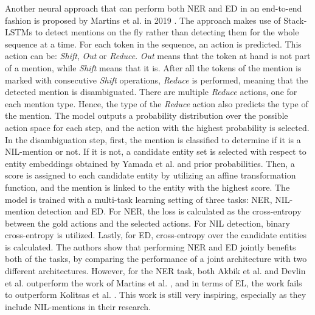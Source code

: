\documentclass{report}
\theoremstyle{definition}
\theoremstyle{remark}
\begin{document}
Another neural approach that can perform both NER and ED in an end-to-end fashion is proposed by Martins et al. in 2019 \cite{StackLSTM}. The approach makes use of Stack-LSTMs \cite{actualStackLSTM} to detect mentions on the fly rather than detecting them for the whole sequence at a time. For each token in the sequence, an action is predicted. This action can be: \textit{Shift}, \textit{Out} or \textit{Reduce}.  \textit{Out} means that the token at hand is not part of a mention, while \textit{Shift} means that it is.  After all the tokens of the mention is marked with consecutive \textit{Shift} operations, \textit{Reduce} is performed, meaning that the detected mention is disambiguated. There are multiple \textit{Reduce} actions, one for each mention type. Hence, the type of the \textit{Reduce} action also predicts the type of the mention. The model outputs a probability distribution over the possible action space for each step, and the action with the highest probability is selected. In the disambiguation step, first, the mention is classified to determine if it is a NIL-mention or not. If it is not, a candidate entity set is selected with respect to entity embeddings obtained by Yamada et al. \cite{yamada-etal-2017-learning} and prior probabilities. Then, a score is assigned to each candidate entity by utilizing an affine transformation function, and the mention is linked to the entity with the highest score. The model is trained with a multi-task learning setting of three tasks: NER, NIL-mention detection and ED. For NER, the loss is calculated as the cross-entropy between the gold actions and the selected actions. For NIL detection, binary cross-entropy is utilized. Lastly, for ED, cross-entropy over the candidate entities is calculated. The authors show that performing NER and ED jointly benefits both of the tasks, by comparing the performance of a joint architecture with two different architectures. However, for the NER task, both Akbik et al. \cite{flairpaper} and Devlin et al. \cite{BERT} outperform the work of Martins et al. \cite{StackLSTM}, and in terms of EL, the work fails to outperform Kolitsas et al. \cite{kolitsas}. This work is still very inspiring, especially as they include NIL-mentions in their research.
\end{document}
